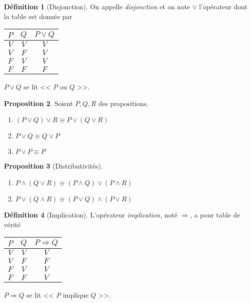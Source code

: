 \documentclass[11pt]{article}
\theoremstyle{definition}
\newtheorem{defn}{Définition}[section]
\newtheorem{prop}[defn]{Proposition}
\theoremstyle{remark}
\begin{document}
\begin{defn}[Disjonction]
On appelle \textit{disjonction} et on note $\lor$ l'opérateur dont la table est donnée par
\begin{table}[h]
\centering
\begin{tabular}{|c|c|c|}\hline
$P$ & $Q$ & $P\lor Q$ \\ \hline
$V$ & $V$ & $V$ \\\hline
$V$ & $F$ & $V$ \\\hline
$F$ & $V$ & $V$ \\\hline
$F$ & $F$ & $F$ \\\hline
\end{tabular}
\end{table}

$P\lor Q$ se lit << $P$ ou $Q$ >>.
\end{defn}

\begin{prop}
Soient $P,Q,R$ des propositions.
\begin{enumerate}
\item $(P\lor Q)\lor R \equiv P\lor (Q\lor R)$
\item $P\lor Q \equiv Q\lor P$
\item $P\lor P\equiv P$
\end{enumerate}
\end{prop}

\begin{prop}[Distributivités]\leavevmode
\begin{enumerate}
\item $P\land (Q\lor R) \equiv(P\land Q)\lor (P\land R)$
\item $P\lor(Q\land R)\equiv (P\lor Q)\land (P\lor R)$
\end{enumerate}

\end{prop}

\newpage
\begin{defn}[Implication]
L'opérateur \textit{implication}, noté $\Rightarrow$, a pour table de vérité
\begin{table}[h]
\centering
\begin{tabular}{|c|c|c|}\hline
$P$ & $Q$ & $P\Rightarrow Q$ \\ \hline
$V$ & $V$ & $V$ \\\hline
$V$ & $F$ & $F$ \\\hline
$F$ & $V$ & $V$ \\\hline
$F$ & $F$ & $V$ \\\hline
\end{tabular}
\end{table}
$P\Rightarrow Q$ se lit << $P$ implique $Q$ >>.
\end{defn}
\end{document}
